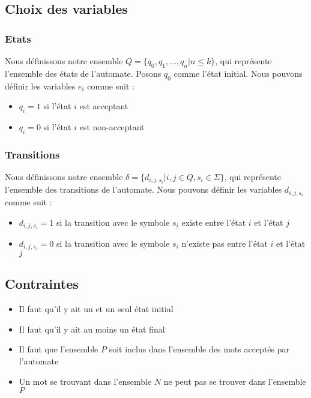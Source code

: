\documentclass[a4paper, 12pt]{extarticle}
\begin{document}
\subsection{Choix des variables} %
\label{sub:choix_des_variables}

\subsubsection{Etats} %
\label{sec:etats}

Nous définissons notre ensemble $Q = \{q_0, q_1, \dots, q_n | n \le k\}$, qui 
représente l'ensemble des états de l'automate. Posons $q_0$ comme l'état initial.
Nous pouvons définir les variables $e_i$ comme suit : 
\begin{itemize}[label=$\bullet$]
    \item $q_i = 1$ si l'état $i$ est acceptant 
    \item $q_i = 0$ si l'état $i$ est non-acceptant 
\end{itemize}


\subsubsection{Transitions} %
\label{sec:transitions} 


Nous définissons notre ensemble $\delta = \{d_{i, j, s_i} | i, j \in Q, s_i \in \Sigma\}$, qui 
représente l'ensemble des transitions de l'automate. 
Nous pouvons définir les variables $d_{i, j, s_i}$ comme suit : 
\begin{itemize}[label=$\bullet$]
    \item $d_{i, j, s_i} = 1$ si la transition avec le symbole $s_i$ existe entre l'état $i$ et l'état $j$ 
    \item $d_{i, j, s_i} = 0$ si la transition avec le symbole $s_i$ n'existe pas entre l'état $i$ et l'état $j$ 
\end{itemize} 

\subsection{Contraintes} %
\label{sub:contraintes}

\begin{itemize}
    \item Il faut qu'il y ait un et un seul état initial 
    \item Il faut qu'il y ait au moins un état final
    \item Il faut que l'ensemble $P$ soit inclus dans l'ensemble des mots acceptés par l'automate 
    \item Un mot se trouvant dans l'ensemble $N$ ne peut pas se trouver dans l'ensemble $P$ 
\end{itemize}
\end{document}
